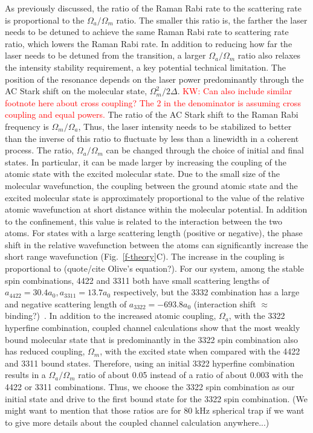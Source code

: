 \documentclass[aps,prl,twocolumn,groupedaddress]{revtex4-1}
\begin{document}
As previously discussed, the ratio of the Raman Rabi rate to the scattering rate is proportional to the $ \Omega_a/\Omega_m $ ratio. The smaller this ratio is, the farther the laser needs to be detuned to achieve the same Raman Rabi rate to scattering rate ratio, which lowers the Raman Rabi rate. In addition to reducing how far the laser needs to be detuned from the transition, a larger $ \Omega_a/\Omega_m$ ratio also relaxes the intensity stability requirement, a key potential technical limitation. The position of the resonance depends on the laser power predominantly through the AC Stark shift on the molecular state, $ \Omega_m^2 / 2\Delta $. \textcolor{red}{KW: Can also include similar footnote here about cross coupling? The 2 in the denominator is assuming cross coupling and equal powers.} The ratio of the AC Stark shift to the Raman Rabi frequency is $ \Omega_m / \Omega_a $, Thus, the laser intensity needs to be stabilized to better than the inverse of this ratio to fluctuate by less than a linewidth in a coherent process. The ratio, $ \Omega_a/\Omega_m $ can be changed through the choice of initial and final states. In particular, it can be made larger by increasing the coupling of the atomic state with the excited molecular state. Due to the small size of the molecular wavefunction, the coupling between the ground atomic state and the excited molecular state is approximately proportional to the value of the relative atomic wavefunction at short distance within the molecular potential. In addition to the confinement, this value is related to the interaction between the two atoms. For states with a large scattering length (positive or negative), the phase shift in the relative wavefunction between the atoms can significantly increase the short range wavefunction (Fig.~\ref{f-theory}C). The increase in the coupling is proportional to (quote/cite Olive's equation?). For our system, among the stable spin combinations, 4422 and 3311 both have small scattering lengths of $ a_{4422}= 30.4a_0, a_{3311} = 13.7a_0 $ respectively, but the 3332 combination has a large and negative scattering length of $ a_{3322} = -693.8a_0 $ (interaction shift $\approx$ binding?)~\cite{Hood2019}. In addition to the increased atomic coupling, $ \Omega_a $, with the 3322 hyperfine combination, coupled channel calculations show that the most weakly bound molecular state that is predominantly in the 3322 spin combination also has reduced coupling, $ \Omega_m $, with the excited state when compared with the 4422 and 3311 bound states. Therefore, using an initial 3322 hyperfine combination results in a $ \Omega_a/\Omega_m$ ratio of about 0.05 instead of a ratio of about 0.003 with the 4422 or 3311 combinations.
Thus, we choose the 3322 spin combination as our initial state and drive to the first bound state for the 3322 spin combination. (We might want to mention that those ratios are for 80 kHz spherical trap if we want to give more details about the coupled channel calculation anywhere...)
\end{document}
